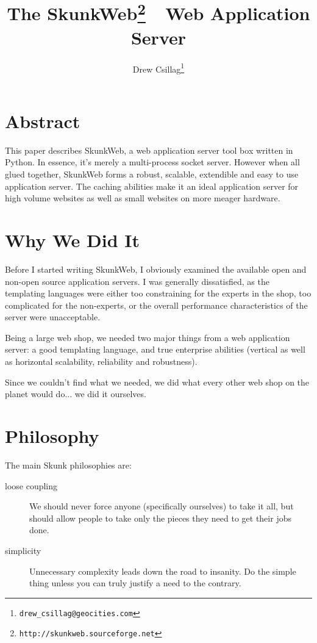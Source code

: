 \documentclass[twocolumn]{article}
\author{Drew Csillag\thanks{\texttt{drew\_csillag@geocities.com}}}
\title{The SkunkWeb\thanks{\texttt{http://skunkweb.sourceforge.net}}\ \ Web Application Server}
\begin{document}
\maketitle


\section*{Abstract}
This paper describes SkunkWeb, a web application server tool box
written in Python\cite{python}.  In essence, it's merely a
multi-process socket server.  However when all glued together,
SkunkWeb forms a robust, scalable, extendible and easy to use
application server.  The caching abilities make it an ideal
application server for high volume websites as well as small websites
on more meager hardware.

\section{Why We Did It}
Before I started writing SkunkWeb, I obviously examined the
available open and non-open source application servers.  I was
generally dissatisfied, as the templating languages
were either too constraining for the experts in the shop, too
complicated for the non-experts, or the overall performance
characteristics of the server were unacceptable.


Being a large web shop, we needed two major things from a web
application server: a good templating language, and true enterprise
abilities (vertical as well as horizontal scalability, reliability
and robustness).

Since we couldn't find what we needed, we did what every other web
shop on the planet would do... we did it ourselves.

\section{Philosophy}
The main Skunk philosophies are:
\begin{description}
\item[loose coupling] We should never force anyone (specifically
ourselves) to take it all, but should allow people to take only the
pieces they need to get their jobs done.
\item[simplicity] Unnecessary complexity leads down the road to
insanity.  Do the simple thing unless you can truly justify a need to
the contrary.
\end{description}
\end{document}
